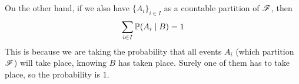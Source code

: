 \documentclass[12pt]{article}
\begin{document}
    On the other hand, if we also have 
    $\{A_i\}_{i \in I}$
    as a countable partition of $\mathscr{F}$,
    then
    \[ \sum_{i \in I}\mathbb{P}(A_i \mid B)
    = 1 \]
    This is because we are taking
    the probability that all events
    $A_i$ (which partition $\mathscr{F}$)
    will take place, knowing $B$
    has taken place.
    Surely one of them has to take place,
    so the probability is $1$. \\
\end{document}
